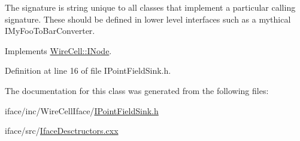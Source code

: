 The signature is string unique to all classes that implement a particular calling signature. These should be defined in lower level interfaces such as a mythical I\+My\+Foo\+To\+Bar\+Converter. 

Implements \hyperlink{class_wire_cell_1_1_i_node_a0b0763465adf5ba7febe8e378162b584}{Wire\+Cell\+::\+I\+Node}.



Definition at line 16 of file I\+Point\+Field\+Sink.\+h.



The documentation for this class was generated from the following files\+:\begin{DoxyCompactItemize}
\item 
iface/inc/\+Wire\+Cell\+Iface/\hyperlink{_i_point_field_sink_8h}{I\+Point\+Field\+Sink.\+h}\item 
iface/src/\hyperlink{_iface_desctructors_8cxx}{Iface\+Desctructors.\+cxx}\end{DoxyCompactItemize}
